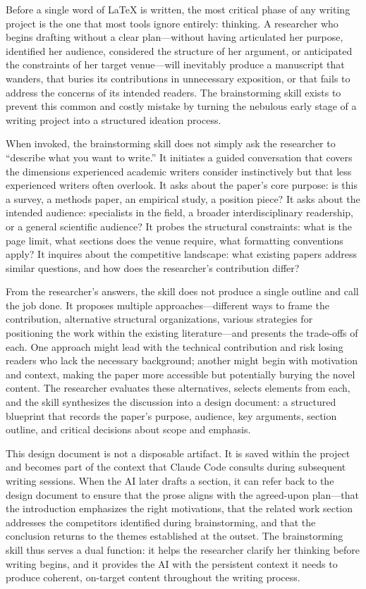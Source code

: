 \documentclass[a4paper,11pt]{article}
\begin{document}
Before a single word of \LaTeX{} is written, the most critical phase of any writing project is the one that most tools ignore entirely: thinking. A researcher who begins drafting without a clear plan---without having articulated her purpose, identified her audience, considered the structure of her argument, or anticipated the constraints of her target venue---will inevitably produce a manuscript that wanders, that buries its contributions in unnecessary exposition, or that fails to address the concerns of its intended readers. The brainstorming skill exists to prevent this common and costly mistake by turning the nebulous early stage of a writing project into a structured ideation process.

When invoked, the brainstorming skill does not simply ask the researcher to ``describe what you want to write.'' It initiates a guided conversation that covers the dimensions experienced academic writers consider instinctively but that less experienced writers often overlook. It asks about the paper's core purpose: is this a survey, a methods paper, an empirical study, a position piece? It asks about the intended audience: specialists in the field, a broader interdisciplinary readership, or a general scientific audience? It probes the structural constraints: what is the page limit, what sections does the venue require, what formatting conventions apply? It inquires about the competitive landscape: what existing papers address similar questions, and how does the researcher's contribution differ?

From the researcher's answers, the skill does not produce a single outline and call the job done. It proposes multiple approaches---different ways to frame the contribution, alternative structural organizations, various strategies for positioning the work within the existing literature---and presents the trade-offs of each. One approach might lead with the technical contribution and risk losing readers who lack the necessary background; another might begin with motivation and context, making the paper more accessible but potentially burying the novel content. The researcher evaluates these alternatives, selects elements from each, and the skill synthesizes the discussion into a design document: a structured blueprint that records the paper's purpose, audience, key arguments, section outline, and critical decisions about scope and emphasis.

This design document is not a disposable artifact. It is saved within the project and becomes part of the context that Claude Code consults during subsequent writing sessions. When the AI later drafts a section, it can refer back to the design document to ensure that the prose aligns with the agreed-upon plan---that the introduction emphasizes the right motivations, that the related work section addresses the competitors identified during brainstorming, and that the conclusion returns to the themes established at the outset. The brainstorming skill thus serves a dual function: it helps the researcher clarify her thinking before writing begins, and it provides the AI with the persistent context it needs to produce coherent, on-target content throughout the writing process.
\end{document}
